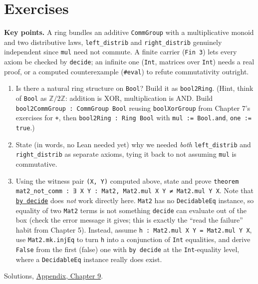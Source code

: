 \section{Exercises}\label{sec:09-rings:08-exercises:1}

\textbf{Key points.} A ring bundles an additive \texttt{CommGroup} with a multiplicative monoid and two distributive laws, \texttt{left\_\allowbreak{}distrib} and \texttt{right\_\allowbreak{}distrib} genuinely independent since \texttt{mul} need not commute. A finite carrier (\texttt{Fin 3}) lets every axiom be checked by \texttt{decide}; an infinite one (\texttt{Int}, matrices over \texttt{Int}) needs a real proof, or a computed counterexample (\texttt{\#eval}) to refute commutativity outright.

\begin{enumerate}
\def\labelenumi{\arabic{enumi}.}
\tightlist
\item
  Is there a natural ring structure on \texttt{Bool}? Build it as \texttt{bool2Ring}. (Hint, think of \texttt{Bool} as \(\mathbb{Z}/2\mathbb{Z}\): addition is XOR, multiplication is AND. Build \texttt{bool2CommGroup : CommGroup Bool} reusing \texttt{boolXorGroup} from Chapter 7's exercises for \texttt{+}, then \texttt{bool2Ring : Ring Bool} with \texttt{mul := Bool.and}, \texttt{one := true}.)
\item
  State (in words, no Lean needed yet) why we needed \emph{both} \texttt{left\_\allowbreak{}distrib} and \texttt{right\_\allowbreak{}distrib} as separate axioms, tying it back to not assuming \texttt{mul} is commutative.
\item
  Using the witness pair \texttt{(X, Y)} computed above, state and prove \texttt{theorem mat2\_\allowbreak{}not\_\allowbreak{}comm : ∃ X Y : Mat2, Mat2.mul X Y ≠ Mat2.mul Y X}. Note that \href{https://lean-lang.org/doc/reference/latest/Tactic-Proofs/Tactic-Reference/}{\texttt{by decide}} does \emph{not} work directly here. \texttt{Mat2} has no \texttt{DecidableEq} instance, so equality of two \texttt{Mat2} terms is not something \texttt{decide} can evaluate out of the box (check the error message it gives; this is exactly the ``read the failure'' habit from Chapter 5). Instead, assume \texttt{h : Mat2.mul X Y = Mat2.mul Y X}, use \texttt{Mat2.mk.injEq} to turn \texttt{h} into a conjunction of \texttt{Int} equalities, and derive \texttt{False} from the first (false) one with \texttt{by decide} at the \texttt{Int}-equality level, where a \texttt{DecidableEq} instance really does exist.
\end{enumerate}

Solutions, \hyperref[sec:15-appendix-solutions:09-chapter-9:1]{Appendix, Chapter 9}.

